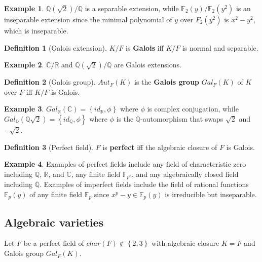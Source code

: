 \documentclass{article}
\newcommand{\F}{\mathbb{F}}
\newcommand{\Q}{\mathbb{Q}}
\newcommand{\R}{\mathbb{R}}
\newcommand{\C}{\mathbb{C}}
\newcommand{\rb}[1]{\left( #1 \right)}
\newcommand{\cb}[1]{\left\{ #1 \right\}}
\theoremstyle{definition}\newtheorem*{definition}{Definition}
\theoremstyle{definition}\newtheorem*{example}{Example}
\theoremstyle{definition}\newtheorem*{remark}{Remark}
\begin{document}
\begin{example}
$ \Q\rb{\sqrt{2}} / \Q $ is a separable extension, while $ \F_2\rb{y} / \F_2\rb{y^2} $ is an inseparable extension since the minimal polynomial of $ y $ over $ F_2\rb{y^2} $ is $ x^2 - y^2 $, which is inseparable.
\end{example}

\begin{definition}[Galois extension]
$ K / F $ is \textbf{Galois} iff $ K / F $ is normal and separable.
\end{definition}

\begin{example}
$ \C / \R $ and $ \Q\rb{\sqrt{2}} / \Q $ are Galois extensions.
\end{example}

\begin{definition}[Galois group]
$ Aut_F\rb{K} $ is the \textbf{Galois group} $ Gal_F\rb{K} $ of $ K $ over $ F $ iff $ K / F $ is Galois.
\end{definition}

\begin{example}
$ Gal_\R\rb{\C} = \cb{id_\R, \phi} $ where $ \phi $ is complex conjugation, while $ Gal_\Q\rb{\Q\sqrt{2}} = \cb{id_\Q, \phi} $ where $ \phi $ is the $ \Q $-automorphism that swaps $ \sqrt{2} $ and $ -\sqrt{2} $.
\end{example}

\begin{definition}[Perfect field]
$ F $ is \textbf{perfect} iff the algebraic closure of $ F $ is Galois.
\end{definition}

\begin{example}
Examples of perfect fields include any field of characteristic zero including $ \Q $, $ \R $, and $ \C $, any finite field $ \F_{p^e} $, and any algebraically closed field including $ \overline{\Q} $. Examples of imperfect fields include the field of rational functions $ \F_p\rb{y} $ of any finite field $ \F_p $ since $ x^p - y \in \F_p\rb{y} $ is irreducible but inseparable.
\end{example}

\pagebreak

\subsection{Algebraic varieties}

Let $ F $ be a perfect field of $ char\rb{F} \notin \cb{2, 3} $ with algebraic closure $ K = \overline{F} $ and Galois group $ Gal_F\rb{K} $.
\end{document}
